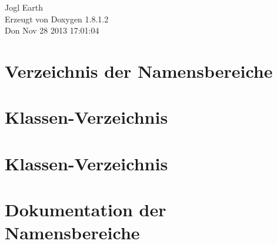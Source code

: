 \documentclass{book}
\begin{document}
\begin{titlepage}
\vspace*{7cm}
\begin{center}
{\Large Jogl Earth }\\
\vspace*{1cm}
{\large Erzeugt von Doxygen 1.8.1.2}\\
\vspace*{0.5cm}
{\small Don Nov 28 2013 17:01:04}\\
\end{center}
\end{titlepage}
\clearemptydoublepage
{}
\tableofcontents
\clearemptydoublepage
{}
\chapter{Verzeichnis der Namensbereiche}

\chapter{Klassen-\/\-Verzeichnis}

\chapter{Klassen-\/\-Verzeichnis}

\chapter{Dokumentation der Namensbereiche}













\end{document}
